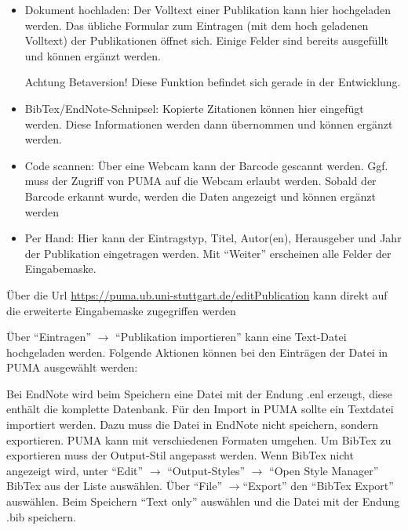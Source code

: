     \begin{itemize}
    	\item Dokument hochladen:\newline
        Der Volltext einer Publikation kann hier hochgeladen werden. Das übliche Formular zum Eintragen (mit dem hoch geladenen Volltext) der Publikationen öffnet sich. Einige Felder sind bereits ausgefüllt und können ergänzt werden.
				\begin{tip}
Achtung Betaversion! Diese Funktion befindet sich gerade in der Entwicklung.
\end{tip}
			\item BibTex/EndNote-Schnipsel:\newline
			Kopierte Zitationen können hier eingefügt werden. Diese Informationen werden dann übernommen und können ergänzt werden.
        \item Code scannen: \newline
Über eine Webcam kann der Barcode gescannt werden. Ggf. muss der Zugriff von PUMA auf die Webcam erlaubt werden. Sobald der Barcode erkannt wurde, werden die Daten angezeigt und können ergänzt werden
        \item Per Hand:
				Hier kann der Eintragstyp, Titel, Autor(en), Herausgeber und Jahr der Publikation eingetragen werden. Mit \enquote{Weiter} erscheinen alle Felder der Eingabemaske. 
    \end{itemize}
\begin{tip} Über die Url \url{https://puma.ub.uni-stuttgart.de/editPublication} kann direkt auf die erweiterte Eingabemaske zugegriffen werden
\end{tip}		
Über \enquote{Eintragen} $\to$ \enquote{Publikation importieren} kann eine Text-Datei hochgeladen werden. Folgende Aktionen können bei den Einträgen der Datei in PUMA ausgewählt werden:
\begin{tip}
Bei EndNote wird beim Speichern eine Datei mit der Endung .enl erzeugt, diese enthält die komplette Datenbank. Für den Import in PUMA sollte ein Textdatei importiert werden. Dazu muss die Datei in EndNote nicht speichern, sondern exportieren. PUMA kann mit verschiedenen Formaten umgehen. Um BibTex zu exportieren muss der Output-Stil angepasst werden. Wenn BibTex nicht angezeigt wird, unter \enquote{Edit} $\to$ \enquote{Output-Styles} $\to$ \enquote{Open Style Manager} BibTex aus der Liste auswählen. Über \enquote{File} $\to$\enquote{Export} den \enquote{BibTex Export} auswählen. Beim Speichern \enquote{Text only} auswählen und die Datei mit der Endung .bib speichern.
\end{tip}
